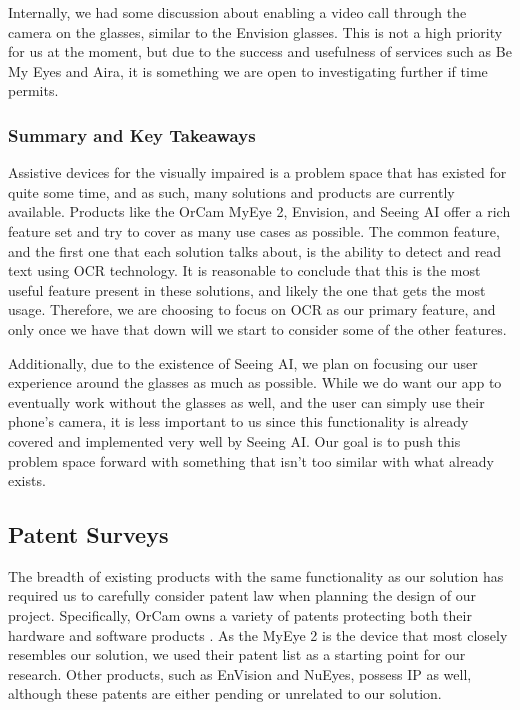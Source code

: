 \documentclass[a4paper,11pt]{article}
\begin{document}
Internally, we had some discussion about enabling a video call through the camera on the glasses, similar to the Envision glasses. This is not a high priority for us at the moment, but due to the success and usefulness of services such as Be My Eyes and Aira, it is something we are open to investigating further if time permits.

\subsubsection{Summary and Key Takeaways}
Assistive devices for the visually impaired is a problem space that has existed for quite some time, and as such, many solutions and products are currently available. Products like the OrCam MyEye 2, Envision, and Seeing AI offer a rich feature set and try to cover as many use cases as possible. The common feature, and the first one that each solution talks about, is the ability to detect and read text using OCR technology. It is reasonable to conclude that this is the most useful feature present in these solutions, and likely the one that gets the most usage. Therefore, we are choosing to focus on OCR as our primary feature, and only once we have that down will we start to consider some of the other features.

Additionally, due to the existence of Seeing AI, we plan on focusing our user experience around the glasses as much as possible. While we do want our app to eventually work without the glasses as well, and the user can simply use their phone's camera, it is less important to us since this functionality is already covered and implemented very well by Seeing AI. Our goal is to push this problem space forward with something that isn't too similar with what already exists.

\subsection{Patent Surveys}
The breadth of existing products with the same functionality as our solution has required us to carefully consider patent law when planning the design of our project. Specifically, OrCam owns a variety of patents protecting both their hardware and software products \cite{orcam-patents}. As the MyEye 2 is the device that most closely resembles our solution, we used their patent list as a starting point for our research. Other products, such as EnVision and NuEyes, possess IP as well, although these patents are either pending \cite{envision-patent} or unrelated to our solution.
\end{document}
